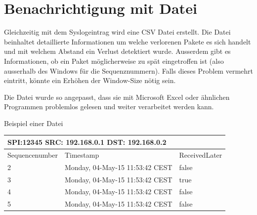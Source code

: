 \section{ Benachrichtigung mit Datei}

\noindent Gleichzeitig mit dem Syslogeintrag wird eine CSV Datei erstellt. Die Datei beinhaltet detaillierte Informationen um welche verlorenen Pakete es sich handelt und mit welchem Abstand ein Verlust detektiert wurde. Ausserdem gibt es Informationen, ob ein Paket möglicherweise zu spät eingetroffen ist (also ausserhalb des Windows für die Sequenznummern). Falls dieses Problem vermehrt eintritt, könnte ein Erhöhen der Window-Size nötig sein.

\noindent Die Datei wurde so angepasst, dass sie mit Microsoft Excel oder ähnlichen Programmen problemlos gelesen und weiter verarbeitet werden kann.

\noindent Beispiel einer Datei

\begin{tabular}{|p{0.9in}|p{1.7in}|p{0.8in}|} \hline 
\multicolumn{2}{|p{1in}|}{SPI:12345 SRC: 192.168.0.1 DST: 192.168.0.2} &  \\ \hline 
Sequencenumber & Timestamp & ReceivedLater \\ \hline 
2 & Monday, 04-May-15 11:53:42 CEST & false \\ \hline 
3 & Monday, 04-May-15 11:53:42 CEST & true \\ \hline 
4 & Monday, 04-May-15 11:53:42 CEST & false \\ \hline 
5 & Monday, 04-May-15 11:53:42 CEST & false \\ \hline 
\end{tabular}

